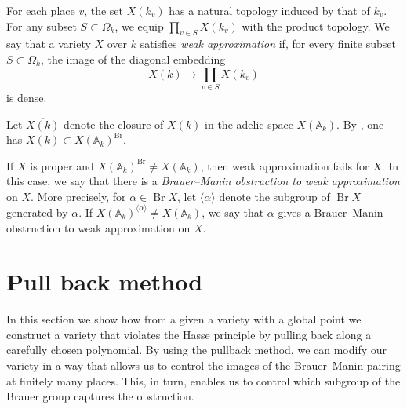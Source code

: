 \documentclass[11pt]{amsart}
\theoremstyle{plain}
\theoremstyle{definition}
\DeclareMathOperator{\Br}{Br}
\begin{document}
For each place $v$, the set $X(k_v)$ has a natural topology induced by that of $k_v$.  
For any subset $S \subset \Omega_k$, we equip $\prod_{v \in S} X(k_v)$ with the product topology. We say that a variety $X$ over $k$ satisfies \emph{weak approximation} if, for every finite subset $S \subset \Omega_k$, the image of the diagonal embedding
\[
X(k) \rightarrow \prod_{v \in S} X(k_v)
\]
is dense.

Let $\overline{X(k)}$ denote the closure of $X(k)$ in the adelic space $X(\mathbb{A}_k)$.  
By \cite[Corollary 8.2.11]{poonen}, one has $\overline{X(k)} \subset X(\mathbb{A}_k)^{\Br}$.

If $X$ is proper and $X(\mathbb{A}_k)^{\Br} \neq X(\mathbb{A}_k)$, then weak approximation fails for $X$. In this case, we say that there is a \emph{Brauer--Manin obstruction to weak approximation} on $X$. More precisely, for $\alpha \in \Br X$, let $\langle \alpha \rangle$ denote the subgroup of $\Br X$ generated by $\alpha$. If $X(\mathbb{A}_k)^{\langle \alpha \rangle} \neq X(\mathbb{A}_k)$, we say that $\alpha$ gives a Brauer--Manin obstruction to weak approximation on $X$. 


\section{Pull back method}\label{pull back method}

 In this section we show how from a given a variety with a global point we construct a variety that violates the Hasse principle by pulling back along a carefully chosen polynomial.
 By using the pullback method, we can modify our variety in a way that allows us to control the images of the Brauer--Manin pairing at finitely many places. This, in turn, enables us to control which subgroup of the Brauer group captures the obstruction.
	
\end{document}
